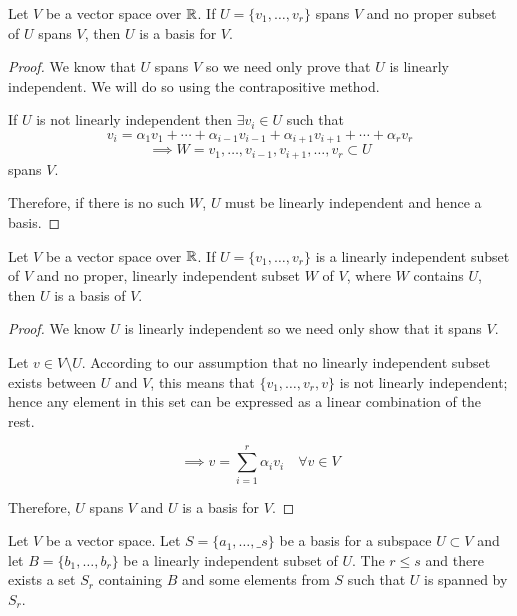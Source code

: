 \documentclass[a4paper,10pt]{article}
\begin{document}
\begin{thm}
	Let $V$ be a vector space over $\mathbb{R}$. If $U = \{v_1, \ldots,
	v_r\}$ spans $V$ and no proper subset of $U$ spans $V$, then $U$
	is a basis for $V$.
\end{thm}

\begin{proof}
	We know that $U$ spans $V$ so we need only prove that $U$ is linearly independent. We will do so using the contrapositive method.

	If $U$ is not linearly independent then $\exists v_i \in U$ such that
	\[
		v_i = \alpha_1 v_1 + \cdots + \alpha_{i-1} v_{i-1} +
		\alpha_{i+1} v_{i+1} + \cdots + \alpha_r v_r
	\]
	\[
		\implies
		W = {v_1, \ldots, v_{i-1}, v_{i+1}, \ldots, v_r}
		\subset U
	\]
	spans $V$.

	Therefore, if there is no such $W$, $U$ must be linearly
	independent and hence a basis.
\end{proof}

\begin{thm}
	Let $V$ be a vector space over $\mathbb{R}$. If $U = \{v_1, \ldots, v_r\}$
	is a linearly independent subset of $V$ and no proper, linearly
	independent  subset $W$ of $V$, where $W$ contains $U$, then $U$
	is a basis of $V$.
\end{thm}

\begin{proof}
	We know $U$ is linearly independent so we need only show that it
	spans $V$.

	Let $v \in V \setminus U$. According to our assumption that no
	linearly independent subset exists between $U$ and $V$, this
	means that $\{v_1, \ldots, v_r, v\}$ is  not linearly
	independent; hence any element in this set can be expressed as a
	linear combination of the rest.

	\[
		\implies
		v = \sum_{i=1}^r \alpha_i v_i \quad \forall v \in V
	\]

	Therefore, $U$ spans $V$ and $U$ is a basis for $V$.
\end{proof}

\begin{lemma}
	Let $V$ be a vector space. Let $S = \{a_1, \ldots, \_s\}$ be a
	basis for a subspace $U \subset V$ and let $B = \{b_1, \ldots,
	b_r\}$ be a linearly independent subset of $U$. The $r \leq s$
	and there exists a set $S_r$ containing $B$ and some elements
	from $S$ such that $U$ is spanned by $S_r$.
\end{lemma}
\end{document}
